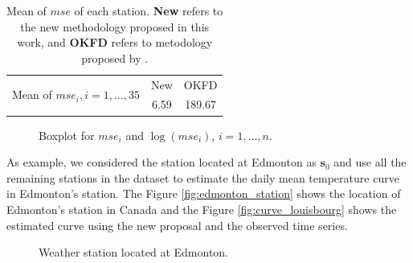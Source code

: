 \documentclass[12pt]{interact}
\theoremstyle{plain}%
\theoremstyle{definition}
\theoremstyle{remark}
\begin{document}
\begin{table}[p]
	\centering
	\caption{Mean of $mse$ of each station. \textbf{New} refers to the new methodology proposed in this work, and \textbf{OKFD} refers to metodology proposed by \cite{giraldo2011ordinary}.}
	\begin{tabular}{lcc}
		\toprule
		\multirow{2}{*}{Mean of $mse_i, i=1,\dots, 35$} & New   & OKFD \\ \cmidrule{2-3}
		& 6.59  & 189.67 \\ \bottomrule
	\end{tabular}
	\label{tab:error}
\end{table}

\begin{figure}[p]
	\centering
	\caption{Boxplot for $mse_i$ and $\log(mse_i)$, $i=1, \dots, n$.}
\end{figure}

As example, we considered the station located at Edmonton as \(\bm{s}_0\) and use all the remaining stations in the dataset to estimate the daily mean temperature curve in Edmonton's station. The Figure \ref{fig:edmonton_station} shows the location of Edmonton's station in Canada and the Figure \ref{fig:curve_louisbourg} shows the estimated curve using the new proposal and the observed time series.
\begin{figure}[htbp]
	\hfill
	
	\caption{Weather station located at Edmonton.}
\end{figure}
\end{document}
